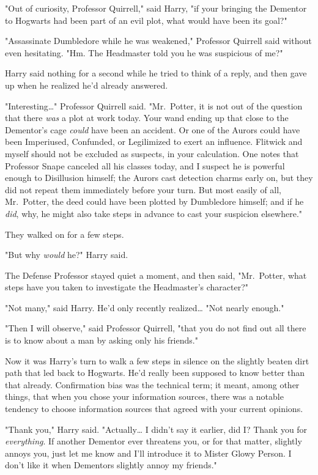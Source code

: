 "Out of curiosity, Professor Quirrell," said Harry, "if your bringing the 
Dementor to Hogwarts had been part of an evil plot, what would have been its 
goal?"

"Assassinate Dumbledore while he was weakened," Professor Quirrell said without 
even hesitating. "Hm. The Headmaster told you he was suspicious of me?"

Harry said nothing for a second while he tried to think of a reply, and then 
gave up when he realized he'd already answered.

"Interesting{\ldots}" Professor Quirrell said. "Mr.~Potter, it is not out of 
the question that there \emph{was} a plot at work today. Your wand ending up 
that close to the Dementor's cage \emph{could} have been an accident. Or one of 
the Aurors could have been Imperiused, Confunded, or Legilimized to exert an 
influence. Flitwick and myself should not be excluded as suspects, in your 
calculation. One notes that Professor Snape canceled all his classes today, and 
I suspect he is powerful enough to Disillusion himself; the Aurors cast 
detection charms early on, but they did not repeat them immediately before your 
turn. But most easily of all, Mr.~Potter, the deed could have been plotted by 
Dumbledore himself; and if he \emph{did}, why, he might also take steps in 
advance to cast your suspicion elsewhere."

They walked on for a few steps.

"But why \emph{would} he?" Harry said.

The Defense Professor stayed quiet a moment, and then said, "Mr.~Potter, what 
steps have you taken to investigate the Headmaster's character?"

"Not many," said Harry. He'd only recently realized{\ldots} "Not nearly enough."

"Then I will observe," said Professor Quirrell, "that you do not find out all 
there is to know about a man by asking only his friends."

Now it was Harry's turn to walk a few steps in silence on the slightly beaten 
dirt path that led back to Hogwarts. He'd really been supposed to know better 
than that already. Confirmation bias was the technical term; it meant, among 
other things, that when you chose your information sources, there was a notable 
tendency to choose information sources that agreed with your current opinions.

"Thank you," Harry said. "Actually{\ldots} I didn't say it earlier, did I? 
Thank you for \emph{everything}. If another Dementor ever threatens you, or for 
that matter, slightly annoys you, just let me know and I'll introduce it to 
Mister Glowy Person. I don't like it when Dementors slightly annoy my friends."

